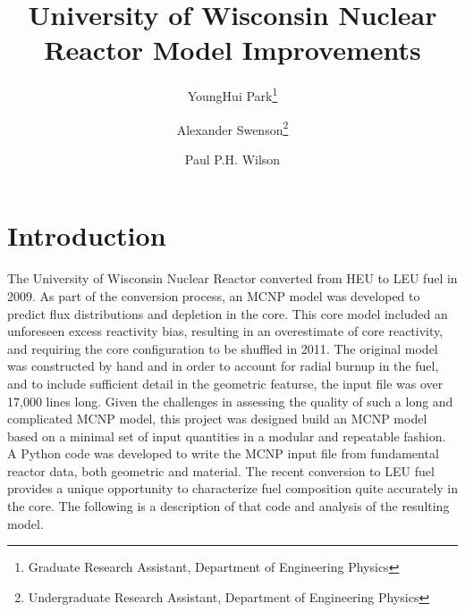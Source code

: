 \documentclass{UWNR_modeling}
\begin{document}
\title{University of Wisconsin Nuclear Reactor Model Improvements}

\author{YoungHui Park\footnote{Graduate Research Assistant, Department of Engineering Physics}}
\author{Alexander Swenson\footnote{Undergraduate Research Assistant, Department of Engineering Physics}}
\author{Paul P.H. Wilson}
\maketitle

\begin{abstract}



\end{abstract}

\section{Introduction}
The University of Wisconsin Nuclear Reactor converted from HEU to LEU fuel in 2009. As part of the conversion process, an MCNP model was developed to predict flux distributions and depletion in the core. This core model included an unforeseen excess reactivity bias, resulting in an overestimate of core reactivity, and requiring the core configuration to be shuffled in 2011\cite{core_shuffle_report}. The original model was constructed by hand and in order to account for radial burnup in the fuel, and to include sufficient detail in the geometric featurse, the input file was over 17,000 lines long. Given the challenges in assessing the quality of such a long and complicated MCNP model, this project was designed build an MCNP model based on a minimal set of input quantities in a modular and repeatable fashion.  A Python code was developed to write the MCNP input file from fundamental reactor data, both geometric and material. The recent conversion to LEU fuel provides a unique opportunity to characterize fuel composition quite accurately in the core. The following is a description of that code and analysis of the resulting model.
\end{document}
